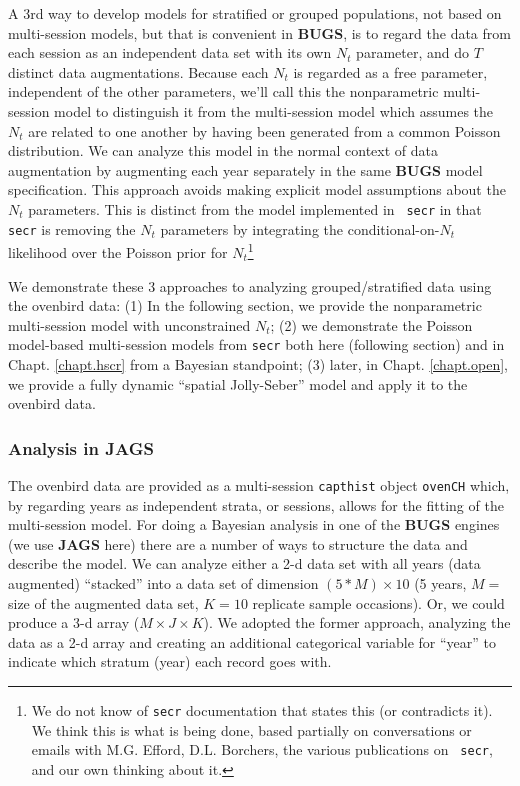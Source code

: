 A 3rd way to develop models for stratified or grouped populations, not
based on multi-session models, but that is convenient in {\bf BUGS},
is to regard the data from each session as an independent data set
with its own $N_{t}$ parameter, and do $T$ distinct data
augmentations. Because each $N_{t}$ is regarded as a free parameter,
independent of the other parameters, we'll call this the nonparametric
multi-session model to distinguish it from the multi-session model
which assumes the $N_{t}$ are related to one another by having been
generated from a common Poisson distribution.  We can analyze this
model in the normal context of data augmentation by augmenting each
year separately in the same {\bf BUGS} model specification. This
approach avoids making explicit model assumptions about the $N_{t}$
parameters.  This is distinct from the model implemented in \mbox{\tt
  secr} in that \mbox{\tt secr} is removing the $N_{t}$ parameters by
integrating the conditional-on-$N_{t}$ likelihood over the Poisson
prior for $N_{t}$\footnote{We do not know of \mbox{\tt secr}
  documentation that states this (or contradicts it). We think this is
  what is being done, based partially on conversations or emails with
M.G. Efford,   D.L. Borchers, the various publications on \mbox{\tt
  secr}, and our own thinking about it.}

We demonstrate these 3 approaches to analyzing grouped/stratified data
using the ovenbird data: (1) In the following section, we provide the
nonparametric multi-session model with unconstrained $N_{t}$; (2) we
demonstrate the Poisson model-based multi-session models from
\mbox{\tt secr} both here (following section) and in
Chapt. \ref{chapt.hscr} from a Bayesian standpoint; (3) later, in
Chapt. \ref{chapt.open}, we provide a fully dynamic ``spatial
Jolly-Seber'' model and apply it to the ovenbird data.


\subsubsection{Analysis in JAGS}

The ovenbird data are provided as a multi-session \mbox{\tt capthist}
object \mbox{\tt ovenCH} which, by regarding years as independent
strata, or sessions, allows for the fitting of the multi-session
model.  For doing a Bayesian analysis in one of the {\bf BUGS} engines
(we use {\bf JAGS} here) there are a number of ways to structure the
data and describe the model.  We can analyze either a 2-d data set
with all years (data augmented) ``stacked'' into a data set of
dimension $(5*M) \times 10$ (5 years, $M=$ size of the augmented data
set, $K=10$ replicate sample occasions). Or, we could produce a 3-d
array ($M \times J \times K$). We adopted the former approach,
analyzing the data as a 2-d array and creating an additional
categorical variable for ``year'' to indicate which stratum (year)
each record goes with.

